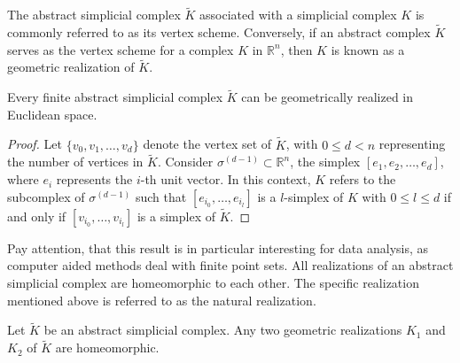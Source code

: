 The abstract simplicial complex $\tilde{K}$ associated with a simplicial complex
$K$ is commonly referred to as its vertex scheme.
Conversely, if an abstract complex $\tilde{K}$ serves as the vertex scheme for a
complex $K$ in $\mathbb{R}^{n}$, then $K$ is known as a geometric realization of $\tilde{K}$.

\begin{proposition}
	Every finite abstract simplicial complex $\tilde{K}$ can be geometrically realized
	in Euclidean space.
\end{proposition}

\begin{proof}
	Let $\{v_{0}, v_{1}, \ldots, v_{d}\}$ denote the vertex set of $\tilde{K}$,
	with $0 \leq d < n$ representing the number of vertices in $\tilde{K}$. Consider $\sigma^{(d-1)}
	\subset \mathbb{R}^{n}$, the simplex
	$[e_{1}, e_{2}, \ldots, e_{d}]$, where $e_{i}$ represents the $i$-th unit vector.
	In this context, $K$ refers to the subcomplex of $\sigma^{(d-1)}$ such that $[e
		_{i_0}, \ldots, e_{i_l}]$ is a $l$-simplex of $K$ with $0 \leq l \leq d$ if and only if $[v_{i_0}, \ldots
	, v_{i_l}]$ is a simplex of $\tilde{K}$.
\end{proof}

Pay attention, that this result is in particular interesting for data analysis, as computer aided methods deal with finite point sets. All realizations of an abstract simplicial complex are homeomorphic to each other.
The specific realization mentioned above is referred to as the natural
realization.

\begin{proposition}
Let $\tilde{K}$ be an abstract simplicial complex. Any two geometric realizations $K_1$ and $K_2$ of $\tilde{K}$ are homeomorphic.
\end{proposition}

